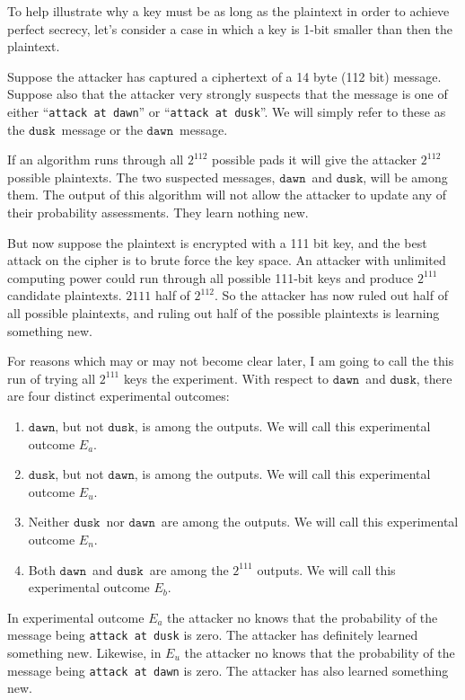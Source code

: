 \documentclass{article}
\newcommand\mdusk{\ensuremath{\mathtt{dusk}}}
\newcommand\mdawn{\ensuremath{\mathtt{dawn}}}
\begin{document}
To help illustrate why a key must be as long as the plaintext in order to achieve perfect secrecy, let's consider a case in which a key is 1-bit smaller than then the plaintext.

Suppose the attacker has captured a ciphertext of a 14 byte (112 bit) message.
Suppose also that the attacker very strongly suspects that the message is one of either “\texttt{attack at dawn}” or “\texttt{attack at dusk}”.
We will simply refer to these as the \mdusk\ message or the \mdawn\ message.

If an algorithm runs through all $2^{112}$ possible pads it will give the attacker $2^{112}$ possible plaintexts.
The two suspected messages, \mdawn\ and \mdusk, will be among them.
The output of this algorithm will not allow the attacker to update any of their probability assessments. They learn nothing new.

But now suppose the plaintext is encrypted with a 111 bit key, and the best attack on the cipher is to brute force the key space.
An attacker with unlimited computing power could run through all possible 111-bit keys and produce $2^{111}$ candidate plaintexts.
$2{111}$ half of $2^{112}$.
So the attacker has now ruled out half of all possible plaintexts,
and ruling out half of the possible plaintexts is learning something new.

For reasons which may or may not become clear later, I am going to call the this run of trying all $2^{111}$ keys the experiment. 
With respect to \mdawn\ and \mdusk, there are four distinct experimental outcomes:

\begin{enumerate}
    \item\label{en:dawn} \mdawn, but not \mdusk, is among the outputs.
        We will call this experimental outcome $E_a$.
    \item\label{en:dusk} \mdusk, but not \mdawn, is among the outputs.
        We will call this experimental outcome $E_u$.
    \item\label{en:neither} Neither \mdusk\ nor \mdawn\ are among the outputs.
    We will call this experimental outcome $E_n$.
    \item\label{en:both} Both \mdawn\ and \mdusk\ are among the $2^{111}$ outputs.
    We will call this experimental outcome $E_b$.
\end{enumerate}

In experimental outcome $E_a$ the attacker no knows that the probability of the message being \texttt{attack at dusk} is zero.
The attacker has definitely learned something new.
Likewise, in $E_u$ the attacker no knows that the probability of the message being \texttt{attack at dawn} is zero.
The attacker has also learned something new.
\end{document}

